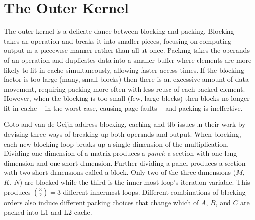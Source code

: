 \documentclass[\main/thesis.tex]{subfiles}
\begin{document}
\section{The Outer Kernel}
The outer kernel is a delicate dance between blocking and packing.
Blocking takes an operation and breaks it into smaller pieces, focusing on computing output in a piecewise manner rather than all at once.
Packing takes the operands of an operation and duplicates data into a smaller buffer where elements are more likely to fit in cache simultaneously, allowing faster access times.
If the blocking factor is too large (\ie many, small blocks) then there is an excessive amount of data movement, requiring packing more often with less reuse of each packed element.
However, when the blocking is too small (\ie few, large blocks) then blocks no longer fit in cache -- in the worst case, causing page faults -- and packing is ineffective.


Goto and van de Geijn address blocking, caching and \gls{tlb} issues in their work by devising three ways of breaking up both operands and output.
When blocking, each new blocking loop breaks up a single dimension of the multiplication.
Dividing one dimension of a matrix produces a \emph{panel}: a section with one long dimension and one short dimension.
Further dividing a panel produces a section with two short dimensions called a block.
Only two of the three dimensions ($M$, $K$, $N$) are blocked while the third is the inner most loop's iteration variable.
This produces ${3 \choose 2}=3$ different innermost loops\footnotemark.
Different combinations of blocking orders also induce different packing choices that change which of $A$, $B$, and $C$ are packed into L1 and L2 cache.
\end{document}
